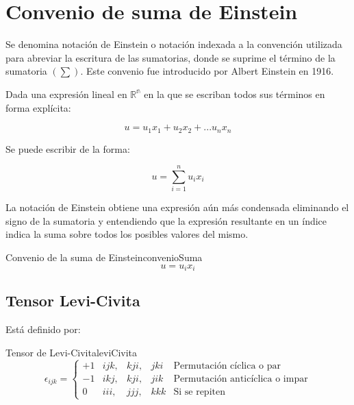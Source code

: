 
\section{Convenio de suma de Einstein}

Se denomina notación de Einstein o notación indexada a la convención utilizada
para abreviar la escritura de las sumatorias, donde se suprime el término de la
sumatoria $(\sum)$. Este convenio fue introducido por Albert Einstein en 1916.

Dada una expresión lineal en $\mathbb{R^{n}}$ en la que se escriban todos sus
términos en forma explícita:

\begin{equation}
    u = u_1 x_1 + u_2 x_2 + ...u_n x_n
\end{equation}

Se puede escribir de la forma:

\begin{equation}
    u = \sum_{i=1}^{n} u_ix_i
\end{equation}

La notación de Einstein obtiene una expresión aún más condensada eliminando el
signo de la sumatoria y entendiendo que la expresión resultante en un índice
indica la suma sobre todos los posibles valores del mismo.

\begin{theorem}{Convenio de la suma de Einstein}{convenioSuma}
    \begin{equation}
        u = u_ix_i
    \end{equation}
\end{theorem}

\subsection{Tensor Levi-Civita}

Está definido por:

\begin{theorem}{Tensor de Levi-Civita}{leviCivita}
\begin{equation}
    \epsilon_{ijk}=
    \left\lbrace\begin{array}{ccccl} 
        +1 & ijk, & kji, & jki & \text{Permutación cíclica o par}\\ 
        -1 & ikj, & kji, & jik & \text{Permutación anticíclica o impar}\\
        0  & iii, & jjj, & kkk & \text{Si se repiten}
    \end{array}\right.
\end{equation}
\end{theorem}

